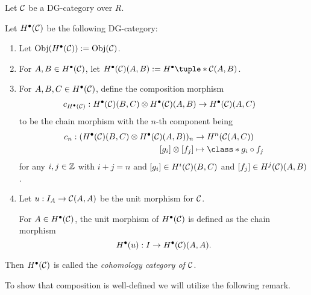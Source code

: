 \begin{definition}
    \label{def:H_bullet_dg_category}
    Let \( {\mathcal{C}} \) be a DG-category over \( R \).

    Let \( H^\bullet({\mathcal{C}}) \) be the following DG-category:
    \begin{enumerate}
        \item Let \( \operatorname{Obj}(H^\bullet({\mathcal{C}})) := \operatorname{Obj}({\mathcal{C}}) \).
        \item For \( A, B \in H^\bullet({\mathcal{C}}) \), let \( H^\bullet(\Cc)(A, B) := H^\bullet \tuple*{\Cc(A, B)} \).
        \item {
            For \( A, B, C \in H^\bullet({\mathcal{C}}) \), define the composition morphism
            \begin{align*}
                c_{H^\bullet({\mathcal{C}})}: H^\bullet({\mathcal{C}})(B, C) \otimes H^\bullet({\mathcal{C}})(A, B) &\to H^\bullet({\mathcal{C}})(A, C)
            \end{align*}
            to be the chain morphism with the \( n \)-th component being
            \begin{align*}
                c_n: (H^\bullet(\Cc)(B, C) \otimes H^\bullet(\Cc)(A, B))_n &\to H^n(\Cc(A, C)) \\
                [g_i] \otimes [f_j] &\mapsto \class*{g_i \circ f_j}
            \end{align*}
            for any \( i, j \in {\mathbb{Z}} \) with \( i + j = n \) and \( [g_i] \in H^i({\mathcal{C}})(B, C) \) and \( [f_j] \in H^j({\mathcal{C}})(A, B) \).
        }
        \item {
            Let \( u: I_A \to {\mathcal{C}}(A, A) \) be the unit morphism for \( {\mathcal{C}} \).
            
            For \( A \in H^\bullet({\mathcal{C}}) \), the unit morphism of \( H^\bullet({\mathcal{C}}) \) is defined as the chain morphism
            \[
                H^\bullet(u): I \to H^\bullet({\mathcal{C}})(A, A).
            \]
        }
    \end{enumerate}

    Then \( H^\bullet({\mathcal{C}}) \) is called the \emph{cohomology category of \( {\mathcal{C}} \)}.
\end{definition}

To show that composition is well-defined we will utilize the following remark.

